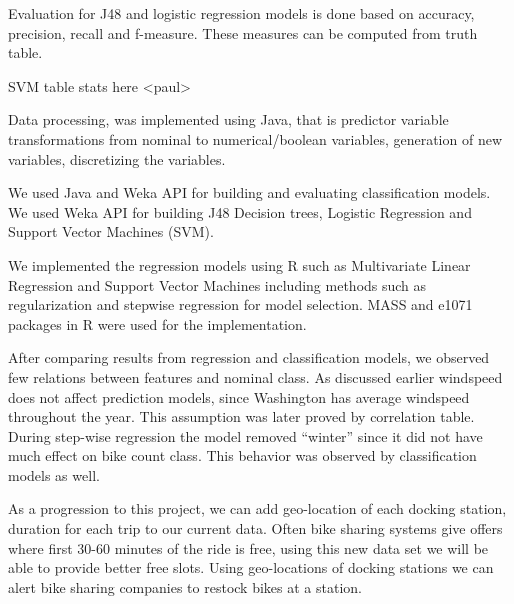 \documentclass[12pt]{article}
\newcommand{\bibfile}{GroupProject}
\begin{document}
            
Evaluation for J48 and logistic regression models is done based on accuracy,
precision, recall and f-measure. These measures can be computed from truth
table.



SVM table stats here <paul>



Data processing, was implemented using Java, that is predictor variable
transformations from nominal to numerical/boolean variables, generation of new
variables, discretizing the variables.

We used Java and Weka API for building and evaluating classification models. We
used Weka API for building J48 Decision trees, Logistic Regression and Support
Vector Machines (SVM).

We implemented the regression models using R such as Multivariate Linear
Regression and Support Vector Machines including methods such as regularization
and stepwise regression for model selection. MASS and e1071 packages in R were
used for the implementation.



After comparing results from regression and classification models, we observed
few relations between features and nominal class. As discussed earlier
windspeed does not affect prediction models, since Washington has average
windspeed throughout the year. This assumption was later proved by correlation
table. During step-wise regression the model removed “winter” since it did not
have much effect on bike count class. This behavior was observed by
classification models as well.



As a progression to this project, we can add geo-location of each docking
station, duration for each trip to our current data. Often bike sharing systems
give offers where first 30-60 minutes of the ride is free, using this new data
set we will be able to provide better free slots. Using geo-locations of
docking stations we can alert bike sharing companies to restock bikes at a
station.



\end{document}
